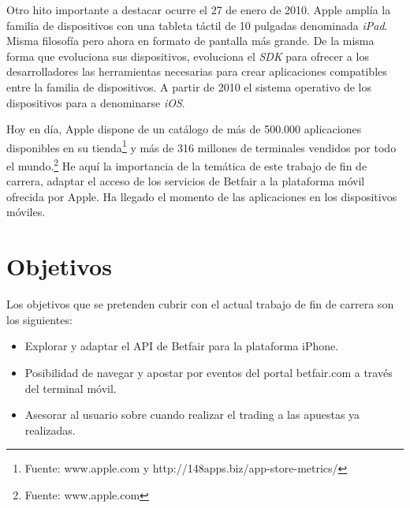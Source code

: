   Otro hito importante a destacar ocurre el 27 de enero de 2010. Apple amplía la familia de dispositivos con una tableta táctil de 10 pulgadas denominada \emph{iPad}. Misma filosofía pero ahora en formato de pantalla más grande. De la misma forma que evoluciona sus dispositivos, evoluciona el \emph{SDK} para ofrecer a los desarrolladores las herramientas necesarias para crear aplicaciones compatibles entre la familia de dispositivos. A partir de 2010 el sistema operativo de los dispositivos para a denominarse \emph{iOS}. 
    
  Hoy en día, Apple dispone de un catálogo de más de 500.000 aplicaciones disponibles en su tienda\footnote{Fuente: www.apple.com y http://148apps.biz/app-store-metrics/} y más de 316 millones de terminales vendidos por todo el mundo.\footnote{Fuente: www.apple.com} He aquí la importancia de la temática de este trabajo de fin de carrera, adaptar el acceso de los servicios de Betfair a la plataforma móvil ofrecida por Apple.  Ha llegado el momento de las aplicaciones en los dispositivos móviles.
    
   
\section{Objetivos}


 Los objetivos que se pretenden cubrir con el actual trabajo de fin de carrera son los siguientes:
 \begin{itemize}
 	\item Explorar y adaptar el API de Betfair para la plataforma iPhone.
 	\item Posibilidad de navegar y apostar por eventos del portal betfair.com a través del terminal móvil.
	\item Asesorar al usuario sobre cuando realizar el trading a las apuestas ya realizadas.
\end{itemize}



